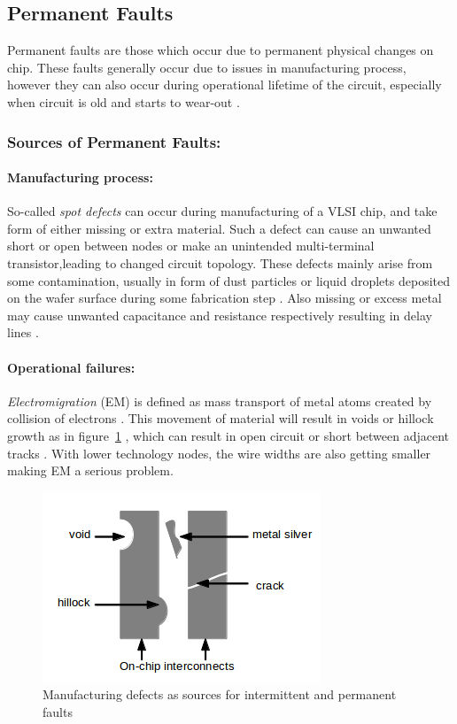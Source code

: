 \subsection{Permanent Faults}
Permanent faults are those which occur due to permanent physical changes on chip. These faults generally occur due to issues in manufacturing process, however they can also occur during operational lifetime of the circuit, especially when circuit is old and starts to wear-out \cite{Lehtonen2009}.

\subsubsection{Sources of Permanent Faults:}
\paragraph{Manufacturing process:}
So-called \emph{spot defects} can occur during manufacturing of a VLSI chip, and take form of either missing or extra material. Such a defect can cause an unwanted short or open between nodes or make an unintended multi-terminal transistor,leading to changed circuit topology. These defects mainly arise from some contamination, usually in form of dust particles or liquid droplets deposited on the wafer surface during some fabrication step \cite{Khare1996}. Also missing or excess metal may cause unwanted capacitance and resistance respectively resulting in delay lines \cite{Wagner1995}.

\paragraph{Operational failures:}
\emph{Electromigration} (EM) is defined as mass transport of metal atoms created by collision of electrons \cite{Ghate1982}. This movement of material will result in voids or hillock growth as in figure~\ref{fig:mfgdefects} \cite{Lehtonen2009}, which can result in open circuit or short between adjacent tracks \cite{AnalogDevices2000}. With lower technology nodes, the wire widths are also getting smaller making EM a serious problem. 

\begin{figure}[h]
  \begin{center}
    \captionsetup{justification=centering}
    \includegraphics[scale=0.75]{figures/mfgdefects.png}
    \caption{Manufacturing defects as sources for intermittent and permanent faults }
    \label{fig:mfgdefects}
  \end{center}
\end{figure}

